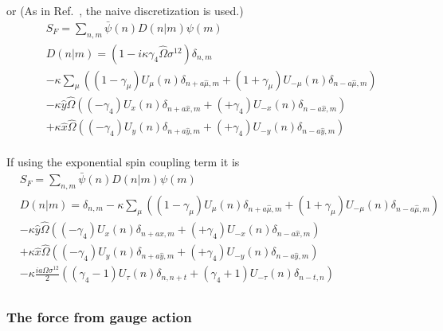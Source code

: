 or (As in Ref.~\cite{rotation}, the naive discretization is used.)
\textcolor[rgb]{0,0,0.8}{
\begin{equation}
\begin{split}
&S_F=\sum _{n,m}\bar{\psi }(n) D(n|m) \psi(m)\\
&D(n|m)=\left(1-i\kappa \gamma _4 \hat{\Omega} \sigma ^{12}\right)\delta _{n,m}\\
&-\kappa\sum _{\mu}\left((1-\gamma _{\mu})U_{\mu}(n)\delta _{n+a\hat{\mu},m}+(1+\gamma _{\mu})U_{-\mu}(n)\delta _{n-a\hat{\mu},m}\right)\\
&-\kappa \hat{y}\hat{\Omega} \left((-\gamma _4)U_{x}(n)\delta _{n+a\hat{x},m}+(+\gamma _4)U_{-x}(n)\delta _{n-a\hat{x},m}\right)\\
&+\kappa \hat{x}\hat{\Omega} \left((-\gamma _4)U_{y}(n)\delta _{n+a\hat{y},m}+(+\gamma _4)U_{-y}(n)\delta _{n-a\hat{y},m}\right)\\
\end{split}
\end{equation}
}

If using the exponential spin coupling term it is
\textcolor[rgb]{0,0,0.8}{
\begin{equation}
\begin{split}
&S_F=\sum _{n,m}\bar{\psi }(n) D(n|m) \psi(m)\\
&D(n|m)=\delta _{n,m}-\kappa\sum _{\mu}\left((1-\gamma _{\mu})U_{\mu}(n)\delta _{n+a\hat{\mu},m}+(1+\gamma _{\mu})U_{-\mu}(n)\delta _{n-a\hat{\mu},m}\right)\\
&-\kappa \hat{y}\hat{\Omega} \left((-\gamma _4)U_{x}(n)\delta _{n+a\hat{x},m}+(+\gamma _4)U_{-x}(n)\delta _{n-a\hat{x},m}\right)\\
&+\kappa \hat{x}\hat{\Omega} \left((-\gamma _4)U_{y}(n)\delta _{n+a\hat{y},m}+(+\gamma _4)U_{-y}(n)\delta _{n-a\hat{y},m}\right)\\
&-\kappa \frac{ia\Omega \sigma ^{12}}{2}\left((\gamma _4-1)U_{\tau}(n)\delta _{n,n+t} +(\gamma _4+1) U_{-\tau}(n)\delta _{n-t,n}\right)\\
\end{split}
\end{equation}
}


\subsubsection{\label{sec:ForceFromGaugeAction}The force from gauge action}

